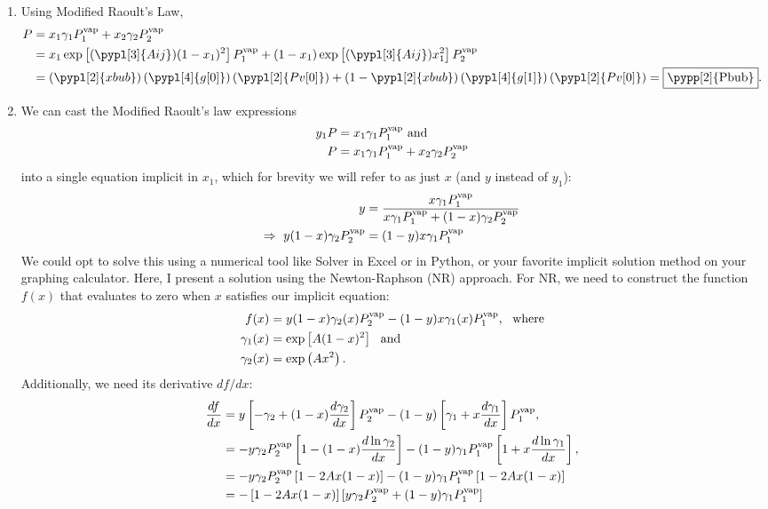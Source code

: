\ifshowsolutions\Solutionheader

\begin{enumerate}
\item[(a)] Using Modified Raoult's Law, 
\begin{align*}
    P & = x_1 \gamma_1 P_1^{\rm vap} + x_2 \gamma_2 P_2^{\rm vap}\\
     & = x_1 \exp\left[(\pypl[3]{Aij})(1-x_1)^2\right] P_1^{\rm vap} + (1-x_1) \exp\left[(\pypl[3]{Aij})x_1^2\right] P_2^{\rm vap}\\
     & = \left(\pypl[2]{xbub}\right)\left(\pypl[4]{g[0]}\right)\left(\pypl[2]{Pv[0]}\right) + \left(1-\pypl[2]{xbub}\right)\left(\pypl[4]{g[1]}\right)\left(\pypl[2]{Pv[0]}\right) = \fbox{\pypp[2]{Pbub}}.
\end{align*}

\item[(b)] We can cast the Modified Raoult's law expressions
\begin{align*}
y_1 P & = x_1 \gamma_1 P_1^{\rm vap}\ \mbox{and}\\
P & = x_1 \gamma_1 P_1^{\rm vap} + x_2 \gamma_2 P_2^{\rm vap}
\end{align*}
into a single equation implicit in $x_1$, which for brevity we will refer to as just $x$ (and $y$ instead of $y_1$):
\begin{align*}
y & = \frac{x \gamma_1 P_1^{\rm vap}}{x \gamma_1 P_1^{\rm vap} + (1-x) \gamma_2 P_2^{\rm vap}}\\
\Rightarrow\  y (1-x) \gamma_2 P_2^{\rm vap} & = (1-y) x \gamma_1 P_1^{\rm vap}
\end{align*}
We could opt to solve this using a numerical tool like Solver in Excel or  in Python, or your favorite implicit solution method on your graphing calculator.  Here, I present a solution using the Newton-Raphson (NR) approach. For NR, we need to construct the function $f(x)$ that evaluates to zero when $x$ satisfies our implicit equation:  
\begin{align*}
f(x) & = y (1-x) \gamma_2(x) P_2^{\rm vap} - (1-y) x \gamma_1(x) P_1^{\rm vap},\ \ \mbox{where}\\
\gamma_1(x) & = \exp\left[A(1-x)^2\right]\ \ \mbox{and}\\
\gamma_2(x) & = \exp\left(Ax^2\right).
\end{align*}
Additionally, we need its derivative $df/dx$:
\begin{align*}
\frac{df}{dx} & = y \left[-\gamma_2+(1-x)\frac{d\gamma_2}{dx}\right] P_2^{\rm vap} - (1-y)\left[\gamma_1 + x\frac{d\gamma_1}{dx}\right] P_1^{\rm vap},\\
& = -y\gamma_2P_2^{\rm vap} \left[1-(1-x)\frac{d\ln\gamma_2}{dx}\right] - (1-y)\gamma_1P_1^{\rm vap}\left[1+x\frac{d\ln\gamma_1}{dx}\right],\\
& = -y\gamma_2P_2^{\rm vap} \left[1-2Ax(1-x)\right] - (1-y)\gamma_1P_1^{\rm vap}\left[1-2Ax(1-x)\right]\\
& = -\left[1-2Ax(1-x)\right]\left[y\gamma_2P_2^{\rm vap}+(1-y)\gamma_1P_1^{\rm vap}\right]
\end{align*}


\end{enumerate}
